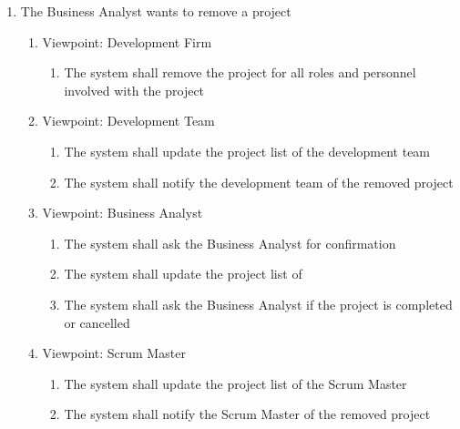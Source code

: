 \documentclass[12pt, titlepage]{article}
\begin{document}
\begin{enumerate}[{BE}1.]
	\item The Business Analyst wants to remove a project
	\begin{enumerate}[{VP}1.] 
	    \item Viewpoint: Development Firm
	        \begin{enumerate}
	            \item The system shall remove the project for all roles and personnel involved with the project
	        \end{enumerate}
	    \item Viewpoint: Development Team
	        \begin{enumerate}
	            \item The system shall update the project list of the development team
	            \item The system shall notify the development team of the removed project
	        \end{enumerate}
		\item Viewpoint: Business Analyst
			\begin{enumerate}
			    \item The system shall ask the Business Analyst for confirmation
			    \item The system shall update the project list of
			    \item The system shall ask the Business Analyst if the project is completed or cancelled
			\end{enumerate}
		\item Viewpoint: Scrum Master
			\begin{enumerate}
	            \item The system shall update the project list of the Scrum Master
	            \item The system shall notify the Scrum Master of the removed project
			\end{enumerate}
	\end{enumerate}
	

\end{enumerate}
\end{document}
